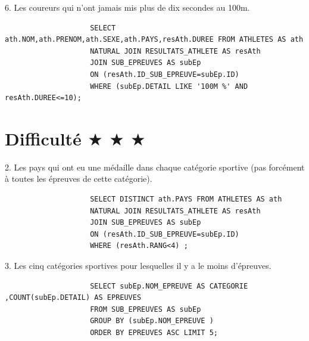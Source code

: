 \documentclass[]{scrreprt}
\begin{document}
			{\large 
				6. Les coureurs qui n'ont jamais mis plus de dix secondes au 100m.
				
			}
			
			{\footnotesize 
				\begin{tcolorbox}
					\begin{verbatim}
					SELECT ath.NOM,ath.PRENOM,ath.SEXE,ath.PAYS,resAth.DUREE FROM ATHLETES AS ath 
					NATURAL JOIN RESULTATS_ATHLETE AS resAth
					JOIN SUB_EPREUVES AS subEp 
					ON (resAth.ID_SUB_EPREUVE=subEp.ID)
					WHERE (subEp.DETAIL LIKE '100M %' AND resAth.DUREE<=10);
					\end{verbatim}
				\end{tcolorbox}
			}
		
		\newpage
			
		\section{Difficulté $\bigstar$ $\bigstar$ $\bigstar$}
		
			{\large 
				2. Les pays qui ont eu une médaille dans chaque catégorie sportive (pas forcément à toutes les épreuves
				de cette catégorie).
				
			}
			
			{\footnotesize 
				\begin{tcolorbox}
					\begin{verbatim}
					SELECT DISTINCT ath.PAYS FROM ATHLETES AS ath 
					NATURAL JOIN RESULTATS_ATHLETE AS resAth 
					JOIN SUB_EPREUVES AS subEp
					ON (resAth.ID_SUB_EPREUVE=subEp.ID) 
					WHERE (resAth.RANG<4) ;
					\end{verbatim}
				\end{tcolorbox}
			}
		
			\vspace{0.5cm}
			
			{\large 
				3. Les cinq catégories sportives pour lesquelles il y a le moins d'épreuves.
				
			}
			
			{\footnotesize 
				\begin{tcolorbox}
					\begin{verbatim}
					SELECT subEp.NOM_EPREUVE AS CATEGORIE ,COUNT(subEp.DETAIL) AS EPREUVES 
					FROM SUB_EPREUVES AS subEp
					GROUP BY (subEp.NOM_EPREUVE )
					ORDER BY EPREUVES ASC LIMIT 5;
					\end{verbatim}
				\end{tcolorbox}
			}
		
\end{document}
